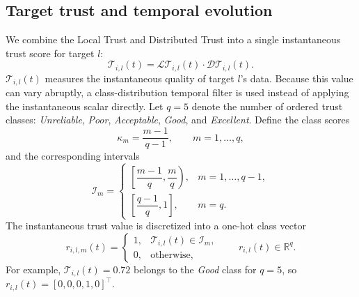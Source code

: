 \documentclass[letterpaper,journal]{IEEEtran}
\def\LT{\mathcal{LT}} %
\def\DT{\mathcal{DT}} %
\def\T{\mathcal{T}} %
\begin{document}
\subsection{Target trust and temporal evolution}\label{subsec_evolution}
We combine the Local Trust and Distributed Trust into a single instantaneous trust score for target $l$:
\begin{equation}
    \T_{i,l}(t) =  \LT_{i,l}(t) \cdot \DT_{i,l}(t).
    \label{trs_sample_genral}
\end{equation}
$\T_{i,l}(t)$ measures the instantaneous quality of target $l$'s data.
Because this value can vary abruptly, a class-distribution temporal filter is used instead of applying the instantaneous scalar directly.
Let $q=5$ denote the number of ordered trust classes:
\textit{Unreliable}, \textit{Poor}, \textit{Acceptable}, \textit{Good}, and \textit{Excellent}.
Define the class scores
\begin{equation}
    \kappa_m=\frac{m-1}{q-1}, \qquad m=1,\ldots,q,
\end{equation}
and the corresponding intervals
\begin{equation}
    \mathcal{I}_m =
    \begin{cases}
    \left[\dfrac{m-1}{q},\dfrac{m}{q}\right), & m=1,\ldots,q-1,\\[1ex]
    \left[\dfrac{q-1}{q},1\right], & m=q.
    \end{cases}
\end{equation}
The instantaneous trust value is discretized into a one-hot class vector
\begin{equation}
    r_{i,l,m}(t)=
    \begin{cases}
    1, & \T_{i,l}(t)\in \mathcal{I}_m,\\
    0, & \text{otherwise,}
    \end{cases}
    \qquad
    r_{i,l}(t)\in\mathbb{R}^{q}.
\end{equation}
For example, $\T_{i,l}(t)=0.72$ belongs to the \textit{Good} class for $q=5$, so $r_{i,l}(t)=[0,0,0,1,0]^\top$.
\end{document}
